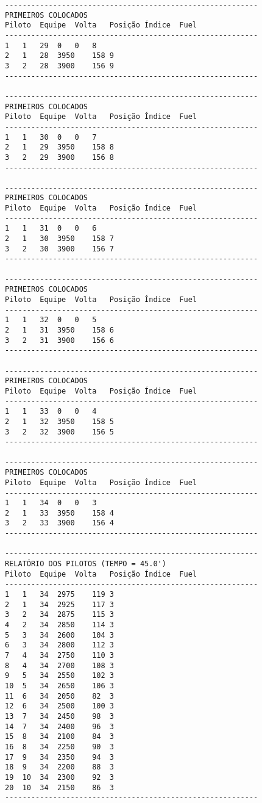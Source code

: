 \documentclass[12pt]{article}
\begin{document}
\begin{verbatim}
----------------------------------------------------------
PRIMEIROS COLOCADOS
Piloto	Equipe	Volta	Posição	Índice	Fuel
----------------------------------------------------------
1	1	29	0	0	8
2	1	28	3950	158	9
3	2	28	3900	156	9
----------------------------------------------------------

----------------------------------------------------------
PRIMEIROS COLOCADOS
Piloto	Equipe	Volta	Posição	Índice	Fuel
----------------------------------------------------------
1	1	30	0	0	7
2	1	29	3950	158	8
3	2	29	3900	156	8
----------------------------------------------------------

----------------------------------------------------------
PRIMEIROS COLOCADOS
Piloto	Equipe	Volta	Posição	Índice	Fuel
----------------------------------------------------------
1	1	31	0	0	6
2	1	30	3950	158	7
3	2	30	3900	156	7
----------------------------------------------------------

----------------------------------------------------------
PRIMEIROS COLOCADOS
Piloto	Equipe	Volta	Posição	Índice	Fuel
----------------------------------------------------------
1	1	32	0	0	5
2	1	31	3950	158	6
3	2	31	3900	156	6
----------------------------------------------------------

----------------------------------------------------------
PRIMEIROS COLOCADOS
Piloto	Equipe	Volta	Posição	Índice	Fuel
----------------------------------------------------------
1	1	33	0	0	4
2	1	32	3950	158	5
3	2	32	3900	156	5
----------------------------------------------------------

----------------------------------------------------------
PRIMEIROS COLOCADOS
Piloto	Equipe	Volta	Posição	Índice	Fuel
----------------------------------------------------------
1	1	34	0	0	3
2	1	33	3950	158	4
3	2	33	3900	156	4
----------------------------------------------------------

----------------------------------------------------------
RELATÓRIO DOS PILOTOS (TEMPO = 45.0')
Piloto	Equipe	Volta	Posição	Índice	Fuel
----------------------------------------------------------
1	1	34	2975	119	3
2	1	34	2925	117	3
3	2	34	2875	115	3
4	2	34	2850	114	3
5	3	34	2600	104	3
6	3	34	2800	112	3
7	4	34	2750	110	3
8	4	34	2700	108	3
9	5	34	2550	102	3
10	5	34	2650	106	3
11	6	34	2050	82	3
12	6	34	2500	100	3
13	7	34	2450	98	3
14	7	34	2400	96	3
15	8	34	2100	84	3
16	8	34	2250	90	3
17	9	34	2350	94	3
18	9	34	2200	88	3
19	10	34	2300	92	3
20	10	34	2150	86	3
----------------------------------------------------------


\end{verbatim}
\end{document}
